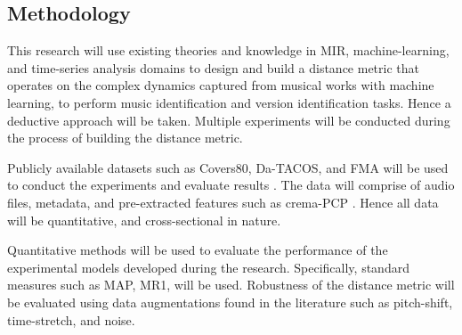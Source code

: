 \documentclass[../main.tex]{subfiles}
\begin{document}
\subsection{Methodology}

\par
This research will use existing theories and knowledge in \gls{MIR}, machine-learning, and time-series analysis domains to design and build a distance metric that operates on the complex dynamics captured from musical works with machine learning, to perform music identification and version identification tasks. Hence a deductive approach will be taken. Multiple experiments will be conducted during the process of building the distance metric.

\par
Publicly available datasets such as Covers80, Da-TACOS, and FMA will be used to conduct the experiments and evaluate results \cite{Covers80CoverSong,yesilerDaTACOSDatasetCover2019,defferrardFMADatasetMusic2017}. The data will comprise of audio files, metadata, and pre-extracted features such as crema-PCP \cite{mcfeeStructuredTrainingLargevocabulary2017}. Hence all data will be quantitative, and cross-sectional in nature.

\par
Quantitative methods will be used to evaluate the performance of the experimental models developed during the research. Specifically, standard measures such as \gls{MAP}, \gls{MR1}, will be used. Robustness of the distance metric will be evaluated using data augmentations found in the literature such as pitch-shift, time-stretch, and noise.


\iffalse
\subsection{Significance of the Project}
\par
Music, being tightly coupled to the flow of time has complex dynamics which it is built upon. Current techniques available for music identification, and version identification do not consider this aspect of music. Therefore more work must be done in this area to explore the usability of this aspect of music to build music and version identification systems. 

\par
Furthermore, the dynamical properties have the potential to reveal patterns inherent to certain composers, genres, cultures, time periods etc. from musical works, which would act as a new basis to conduct more research in the \gls{MIR} domain.
\fi
\end{document}
